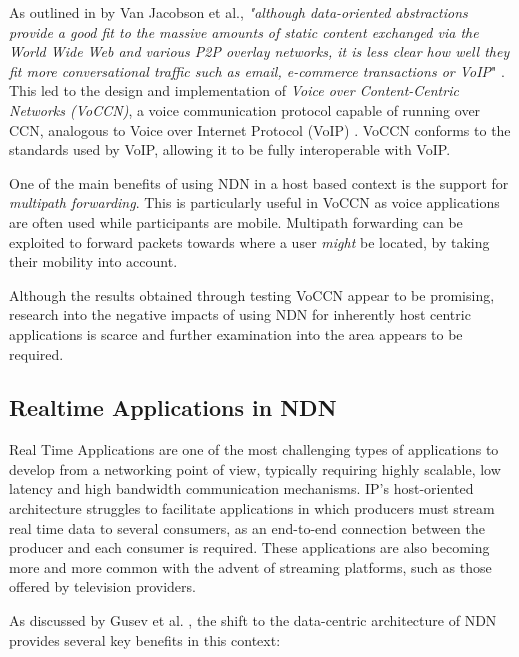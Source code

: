 As outlined in by Van Jacobson et al., \textit{"although data-oriented abstractions provide a good fit to the massive amounts of static content exchanged via the World Wide Web and various P2P overlay networks, it is less clear how well they fit more conversational traffic such as email, e-commerce transactions or VoIP}" \cite{vj-voccn}. This led to the design and implementation of \textit{Voice over Content-Centric Networks (VoCCN)}, a voice communication protocol capable of running over CCN, analogous to Voice over Internet Protocol (VoIP) \cite{voip}. VoCCN conforms to the standards used by VoIP, allowing it to be fully interoperable with VoIP. 

One of the main benefits of using NDN in a host based context is the support for \textit{multipath forwarding}. This is particularly useful in VoCCN as voice applications are often used while participants are mobile. Multipath forwarding can be exploited to forward packets towards where a user \textit{might} be located, by taking their mobility into account.

Although the results obtained through testing VoCCN appear to be promising, research into the negative impacts of using NDN for inherently host centric applications is scarce and further examination into the area appears to be required.


\subsection{Realtime Applications in NDN}
Real Time Applications are one of the most challenging types of applications to develop from a networking point of view, typically requiring highly scalable, low latency and high bandwidth communication mechanisms. IP's host-oriented architecture struggles to facilitate applications in which producers must stream real time data to several consumers, as an end-to-end connection between the producer and each consumer is required. These applications are also becoming more and more common with the advent of streaming platforms, such as those offered by television providers.

As discussed by Gusev et al. \cite{realtime-streaming-data}, the shift to the data-centric architecture of NDN provides several key benefits in this context:

